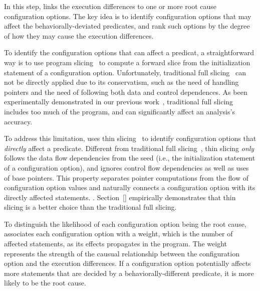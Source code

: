 


In this step, \ourtool links the execution differences
to one or more root cause configuration options.
The key idea is to identify configuration options that
may affect the behaviorally-deviated predicates, and rank
such options by the degree of how they may cause
the execution differences.


To identify the configuration options that can affect
a predicat, a straightforward way is to use program slicing~\cite{}
to compute a forward slice from the initialization statement
of a configuration option. Unfortunately, traditional
full slicing~\cite{} can not be directly applied due
to its conservatism, such as the need of handling pointers
and the need of following both data and control dependences.
As been experimentally demonstrated in our
previous work~\cite{}, traditional full slicing includes
too much of the program, and can significantly affect an analysis's
accuracy. 


To address this limitation, \ourtool uses thin slicing~\cite{}
to identify configuration options that \textit{directly} affect
a predicate. Different from traditional full slicing~\cite{},
thin slicing \textit{only} follows the data flow dependencies
from the seed (i.e., the initialization statement of a
configuration option), and ignores control flow dependencies
as well as uses of base pointers. This property separates
pointer computations from the flow of configuration option
values and naturally connects a configuration option with its
directly affected statements. . Section~\ref{}
empirically demonstrates that thin slicing is a better
choice than the traditional full slicing.


To distinguish the likelihood of each configuration
option being the root cause, \ourtool associates each
configuration option with a weight, which is the number
of affected statements, as its effects propagates
in the program.  The weight represents the strength of
the causual relationship between the configuration option
and the execution differences. If a configuration option
potentially affects more statements that are decided
by a behaviorally-different predicate, it is more likely
to be the root cause.

